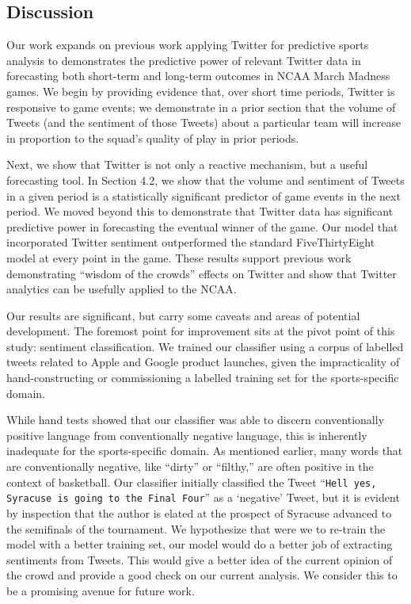 \documentclass[12pt]{article}
\begin{document}
\begin{doublespacing}
\section{Discussion}

Our work expands on previous work applying Twitter for predictive sports analysis to demonstrates the predictive power of relevant Twitter data in forecasting both short-term and long-term outcomes in NCAA March Madness games. We begin by providing evidence that, over short time periods, Twitter is responsive to game events; we demonstrate in a prior section that the volume of Tweets (and the sentiment of those Tweets) about a particular team will increase in proportion to the squad's quality of play in prior periods.

Next, we show that Twitter is not only a reactive mechanism, but a useful forecasting tool. In Section 4.2, we show that the volume and sentiment of Tweets in a given period is a statistically significant predictor of game events in the next period. We moved beyond this to demonstrate that Twitter data has significant predictive power in forecasting the eventual winner of the game. Our model that incorporated Twitter sentiment outperformed the standard FiveThirtyEight model at every point in the game. These results support previous work demonstrating ``wisdom of the crowds'' effects on Twitter and show that Twitter analytics can be usefully applied to the NCAA. 

Our results are significant, but carry some caveats and areas of potential development. The foremost point for improvement sits at the pivot point of this study: sentiment classification. We trained our classifier using a corpus of labelled tweets related to Apple and Google product launches, given the impracticality of hand-constructing or commissioning a labelled training set for the sports-specific domain. 

While hand tests showed that our classifier was able to discern conventionally positive language from conventionally negative language, this is inherently inadequate for the sports-specific domain. As mentioned earlier, many words that are conventionally negative, like ``dirty'' or ``filthy,'' are often positive in the context of basketball. Our classifier initially classified the Tweet ``\texttt{Hell yes, Syracuse is going to the Final Four}'' as a `negative' Tweet, but it is evident by inspection that the author is elated at the prospect of Syracuse advanced to the semifinals of the tournament. We hypothesize that were we to re-train the model with a better training set, our model would do a better job of extracting sentiments from Tweets. This would give a better idea of the current opinion of the crowd and provide a good check on our current analysis. We consider this to be a promising avenue for future work.


\end{doublespacing}
\end{document}
